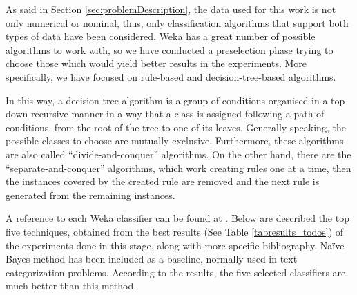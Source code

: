 \documentclass{llncs}
\begin{document}
\noindent As said in Section \ref{sec:problemDescription}, the data used for this work is not only numerical or nominal, thus, only classification algorithms that support both types of data have been considered. Weka has a great number of possible algorithms to work with, so we have conducted a preselection phase trying to choose those which would yield better results in the experiments. More specifically, we have focused on rule-based and decision-tree-based algorithms. 


In this way, a decision-tree algorithm is a group of conditions organised in a top-down recursive manner in a way that a class is assigned following a path of conditions, from the root of the tree to one of its leaves. Generally speaking, the possible classes to choose are mutually exclusive. Furthermore, these algorithms are also called ``divide-and-conquer'' algorithms. On the other hand, there are the ``separate-and-conquer'' algorithms, which work creating rules one at a time, then the instances covered by the created rule are removed and the next rule is generated from the remaining instances.

A reference to each Weka classifier can be found at \cite{Frank2011}. Below are described the top five techniques, obtained from the best results (See Table \ref{tabresults_todos}) of the experiments done in this stage, along with more specific bibliography. Naïve Bayes method \cite{Bayesian_Classifier_97} has been included as a baseline, normally used in text categorization problems. According to the results, the five selected classifiers are much better than this method.
\end{document}
